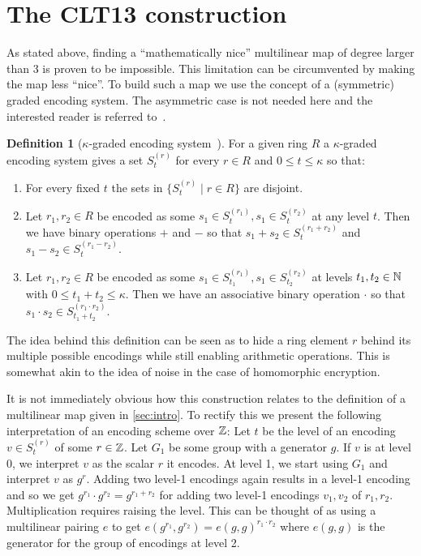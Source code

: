 \documentclass[english]{scrartcl}
\theoremstyle{plain}
\theoremstyle{definition}
\newtheorem{definition}[lemma]{Definition}
\begin{document}
    \section{The CLT13 construction}
    As stated above, finding a \enquote{mathematically nice} multilinear map of degree larger than 3 is proven to be impossible. This limitation can be circumvented by making the map less \enquote{nice}.
    To build such a map we use the concept of a (symmetric) graded encoding system. The asymmetric case is not needed here and the interested reader is referred to~\cite{cryptoeprint:mm_gentry}.
    \begin{definition}[$\kappa$-graded encoding system~\cite{cryptoeprint:2013:183}]
        For a given ring $R$ a $\kappa$-graded encoding system gives a set $S^{(r)}_t$ for every $r \in R$ and $0 \leq t \leq \kappa$ so that:
        \begin{enumerate}
            \item For every fixed $t$ the sets in $\{ S^{(r)}_t \mid r \in R \}$ are disjoint.
            \item Let $r_1, r_2 \in R$ be encoded as some $s_1 \in S^{(r_1)}_t, s_1 \in S^{(r_2)}_t$ at any level $t$. Then we have binary operations $+$ and $-$ so that $s_1 + s_2 \in S^{(r_1 + r_2)}_t$ and $s_1 - s_2 \in S^{(r_1 - r_2)}_t$.
            \item Let $r_1, r_2 \in R$ be encoded as some $s_1 \in S^{(r_1)}_{t_1}, s_1 \in S^{(r_2)}_{t_2}$ at levels $t_1, t_2 \in \mathbb{N}$ with $0 \leq t_1 + t_2 \leq \kappa$. Then we have an associative binary operation $\cdot$ so that $s_1 \cdot s_2 \in S^{(r_1 \cdot r_2)}_{t_1 + t_2}$.
        \end{enumerate}
    \end{definition}

    The idea behind this definition can be seen as to hide a ring element $r$ behind its multiple possible encodings while still enabling arithmetic operations. This is somewhat akin to the idea of noise in the case of homomorphic encryption.

    It is not immediately obvious how this construction relates to the definition of a multilinear map given in \cref{sec:intro}. To rectify this we present the following interpretation of an encoding scheme over $\mathbb{Z}$:
    Let $t$ be the level of an encoding $v \in S^{(r)}_t$ of some $r \in \mathbb{Z}$. Let $G_1$ be some group with a generator $g$. If $v$ is at level 0, we interpret $v$ as the scalar $r$ it encodes. At level 1, we start using $G_1$ and interpret $v$ as $g^r$. Adding two level-1 encodings again results in a level-1 encoding and so we get $g^{r_1} \cdot g^{r_2} = g^{r_1 + r_2}$ for adding two level-1 encodings $v_1, v_2$ of $r_1, r_2$.
    Multiplication requires raising the level. This can be thought of as using a multilinear pairing $e$ to get $e(g^{r_1}, g^{r_2}) = e(g, g)^{r_1 \cdot r_2}$ where $e(g,g)$ is the generator for the group of encodings at level 2.~\cite{zimmerman}
\end{document}
